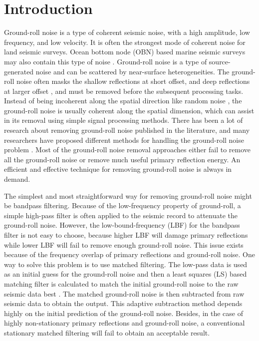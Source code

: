 \section{Introduction} 
Ground-roll noise is a type of coherent seismic noise, with a high amplitude, low frequency, and low velocity. It is often the strongest mode of coherent noise for land seismic surveys. Ocean bottom node (OBN) based marine seismic surveys may also contain this type of noise \cite{yangkang20142}. Ground-roll noise is a type of source-generated noise and can be scattered by near-surface heterogeneities.  The ground-roll noise often masks the shallow reflections at short offset, and deep reflections at larger offset \cite{claerbout1983,saatilar1988,henley2003}, and must be removed before the subsequent processing tasks. Instead of being incoherent along the spatial direction like random noise \cite{wencheng2015asa,yangkang2015}, the ground-roll noise is usually coherent along the spatial dimension, which can assist in its removal using simple signal processing methods.  There has been a lot of research about removing ground-roll noise published in the literature, and many researchers have proposed different methods for handling the ground-roll noise problem \cite{shieh1990,brown2000}. Most of the ground-roll noise removal approaches either fail to remove all the ground-roll noise or remove much useful primary reflection energy. An efficient and effective technique for removing ground-roll noise is always in demand. 

The simplest and most straightforward way for removing ground-roll noise might be bandpass filtering. Because of the low-frequency property of ground-roll, a simple high-pass filter is often applied to the seismic record to attenuate the ground-roll noise. However, the low-bound-frequency (LBF) for the bandpass filter is not easy to choose, because higher LBF will damage primary reflections while lower LBF will fail to remove enough ground-roll noise. This issue exists because of the frequency overlap of primary reflections and ground-roll noise. One way to solve this problem is to use matched filtering. The low-pass data is used as an initial guess for the ground-roll noise and then a least squares (LS) based matching filter is calculated to match the initial ground-roll noise to the raw seismic data best \cite{carson2006,stephen2007,halliday2010}. The matched ground-roll noise is then subtracted from raw seismic data to obtain the output. This adaptive subtraction method depends highly on the initial prediction of the ground-roll noise. Besides, in the case of highly non-stationary primary reflections and ground-roll noise, a conventional stationary matched filtering will fail to obtain an acceptable result.  

